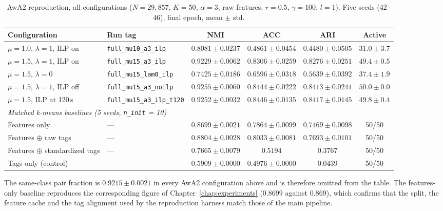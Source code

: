 \begin{table}[H]
    \centering
    \footnotesize
    \setlength{\tabcolsep}{4pt}
    \caption[Per-configuration AwA2 reproduction results]{AwA2 reproduction, all configurations ($N = 29{,}857$, $K = 50$, $\alpha = 3$, raw features, $r = 0.5$, $\gamma = 100$, $l = 1$). Five seeds (42--46), final epoch, mean $\pm$ std.}
    \label{tab:c_awa2_runs}
    \begin{tabular}{llcccc}
        \toprule
        \textbf{Configuration} & \textbf{Run tag} & \textbf{NMI} & \textbf{ACC} & \textbf{ARI} & \textbf{Active} \\
        \midrule
        $\mu = 1.0$, $\lambda = 1$, ILP on & \texttt{full\_mu10\_a3\_ilp} & $0.8081 \pm 0.0237$ & $0.4861 \pm 0.0454$ & $0.4480 \pm 0.0505$ & $31.0 \pm 3.7$ \\
        $\mu = 1.5$, $\lambda = 1$, ILP on & \texttt{full\_mu15\_a3\_ilp} & $0.9229 \pm 0.0062$ & $0.8306 \pm 0.0259$ & $0.8276 \pm 0.0251$ & $49.4 \pm 0.5$ \\
        $\mu = 1.5$, $\lambda = 0$ & \texttt{full\_mu15\_lam0\_ilp} & $0.7425 \pm 0.0186$ & $0.6596 \pm 0.0318$ & $0.5639 \pm 0.0392$ & $37.4 \pm 1.9$ \\
        $\mu = 1.5$, $\lambda = 1$, ILP off & \texttt{full\_mu15\_a3\_noilp} & $0.9255 \pm 0.0060$ & $0.8444 \pm 0.0222$ & $0.8413 \pm 0.0241$ & $50.0 \pm 0.0$ \\
        $\mu = 1.5$, ILP at 120\,s & \texttt{full\_mu15\_a3\_ilp\_t120} & $0.9252 \pm 0.0032$ & $0.8446 \pm 0.0135$ & $0.8417 \pm 0.0145$ & $49.8 \pm 0.4$ \\
        \midrule
        \multicolumn{6}{l}{\textit{Matched k-means baselines (5 seeds, \texttt{n\_init} = 10)}} \\
        Features only & --- & $0.8699 \pm 0.0021$ & $0.7864 \pm 0.0099$ & $0.7469 \pm 0.0098$ & 50/50 \\
        Features $\oplus$ raw tags & --- & $0.8804 \pm 0.0028$ & $0.8033 \pm 0.0081$ & $0.7693 \pm 0.0101$ & 50/50 \\
        Features $\oplus$ standardized tags & --- & $0.7665 \pm 0.0079$ & $0.5194$ & $0.3767$ & 50/50 \\
        Tags only (control) & --- & $0.5909 \pm 0.0000$ & $0.4976 \pm 0.0000$ & $0.0439$ & 50/50 \\
        \bottomrule
    \end{tabular}
\end{table}

The same-class pair fraction is $0.9215 \pm 0.0021$ in every AwA2 configuration above and is therefore omitted from the table. The features-only baseline reproduces the corresponding figure of Chapter~\ref{chap:experiments} ($0.8699$ against $0.869$), which confirms that the split, the feature cache and the tag alignment used by the reproduction harness match those of the main pipeline.

